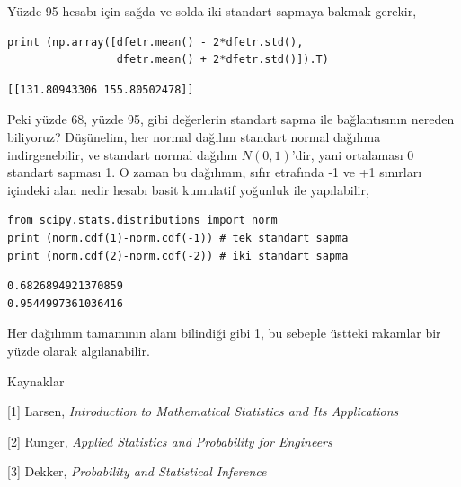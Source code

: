 \documentclass[12pt,fleqn]{article}\usepackage{../../common}
\begin{document}
Yüzde 95 hesabı için sağda ve solda iki standart sapmaya bakmak gerekir,

\begin{verbatim}
print (np.array([dfetr.mean() - 2*dfetr.std(),
                 dfetr.mean() + 2*dfetr.std()]).T)
\end{verbatim}

\begin{verbatim}
[[131.80943306 155.80502478]]
\end{verbatim}

Peki yüzde 68, yüzde 95, gibi değerlerin standart sapma ile bağlantısının
nereden biliyoruz? Düşünelim, her normal dağılım standart normal dağılıma
indirgenebilir, ve standart normal dağılım $N(0,1)$'dir, yani ortalaması 0
standart sapması 1. O zaman bu dağılımın, sıfır etrafında -1 ve +1
sınırları içindeki alan nedir hesabı basit kumulatif yoğunluk ile
yapılabilir, 

\begin{verbatim}
from scipy.stats.distributions import norm
print (norm.cdf(1)-norm.cdf(-1)) # tek standart sapma
print (norm.cdf(2)-norm.cdf(-2)) # iki standart sapma
\end{verbatim}

\begin{verbatim}
0.6826894921370859
0.9544997361036416
\end{verbatim}

Her dağılımın tamamının alanı bilindiği gibi 1, bu sebeple üstteki rakamlar
bir yüzde olarak algılanabilir.

Kaynaklar 

[1] Larsen, {\em Introduction to Mathematical Statistics and Its Applications}

[2] Runger, {\em Applied Statistics and Probability for Engineers}

[3] Dekker, {\em Probability and Statistical Inference}
\end{document}
